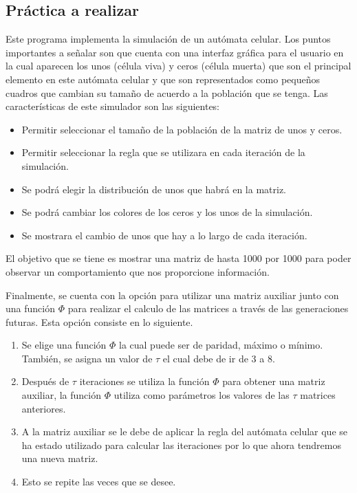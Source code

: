 \documentclass[a4paper,12pt]{article}
\begin{document}
\subsection{Práctica a realizar}
Este programa implementa la simulación de un autómata celular. Los puntos importantes a señalar son que cuenta con una interfaz gráfica para el usuario en la cual aparecen los unos (célula viva) y ceros (célula muerta) que son el principal elemento en este autómata celular y que son representados como pequeños cuadros que cambian su tamaño de acuerdo a la población que se tenga. Las características de este simulador son las siguientes:
\begin{itemize}
 \item Permitir seleccionar el tamaño de la población de la matriz de unos y ceros.
 \item Permitir seleccionar la regla que se utilizara en cada iteración de la simulación.
 \item Se podrá elegir la distribución de unos que habrá en la matriz.
 \item Se podrá cambiar los colores de los ceros y los unos de la simulación.
 \item Se mostrara el cambio de unos que hay a lo largo de cada iteración.
\end{itemize}
El objetivo que se tiene es mostrar una matriz de hasta 1000 por 1000 para poder observar un comportamiento que nos proporcione información.

Finalmente, se cuenta con la opción para utilizar una matriz auxiliar junto con una función $\Phi$ para realizar el calculo de las matrices a través de las generaciones futuras. Esta opción consiste en lo siguiente.

\begin{enumerate}
 \item Se elige una función $\Phi$ la cual puede ser de paridad, máximo o mínimo. También, se asigna un valor de $\tau$ el cual debe de ir de 3 a 8.
 \item Después de $\tau$ iteraciones se utiliza la función $\Phi$ para obtener una matriz auxiliar, la función $\Phi$ utiliza como parámetros los valores de las $\tau$ matrices anteriores.
 \item A la matriz auxiliar se le debe de aplicar la regla del autómata celular que se ha estado utilizado para calcular las iteraciones por lo que ahora tendremos una nueva matriz.
 \item Esto se repite las veces que se desee.
\end{enumerate}
\end{document}
